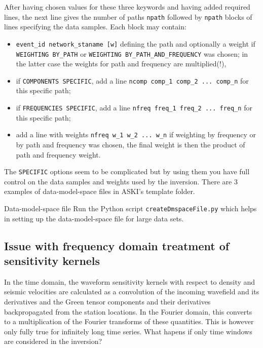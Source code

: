  After having chosen values for these three keywords and having added required lines, the next line gives the number of paths \verb+npath+ followed by \verb+npath+ blocks of lines specifying the data samples. Each block may contain:
\begin{itemize}
	\setlength{\itemsep}{-0.1cm}
	\item \verb+event_id network_staname [w]+ defining the path and optionally a weight if \\ \verb+WEIGHTING BY_PATH+ or \verb+WEIGHTING BY_PATH_AND_FREQUENCY+ was chosen; in the latter case the weights for path and frequency are multiplied(!),
	\item if \verb+COMPONENTS SPECIFIC+, add a line \verb+ncomp comp_1 comp_2 ... comp_n+ for this specific path;
	\item if \verb+FREQUENCIES SPECIFIC+, add a line \verb+nfreq freq_1 freq_2 ... freq_n+ for this specific path;
	\item add a line with weights \verb+nfreq w_1 w_2 ... w_n+ if weighting by frequency or by path and frequency was chosen, the final weight is then the product of path and frequency weight.
\end{itemize}
The \verb+SPECIFIC+ options seem to be complicated but by using them you have full control on the data samples and weights used by the inversion. There are 3 examples of data-model-space files in ASKI's template folder.
%
 \begin{actionbox}[label={action:dmsp-file},float=h!]{Data-model-space file}
    Run the Python script \verb+createDmspaceFile.py+ which helps in setting up the data-model-space file for large data sets.
 \end{actionbox}
%
\subsection{Issue with frequency domain treatment of sensitivity kernels}
%
 In the time domain, the waveform sensitivity kernels with respect to density and seismic velocities are calculated as a convolution of the incoming wavefield and its derivatives and the Green tensor components and their derivatives backpropagated from the station locations. In the Fourier domain, this converts to a multiplication of the Fourier transforms of these quantities. This is however only fully true for infinitely long time series. What hapens if only time windows are considered in the inversion?
 

